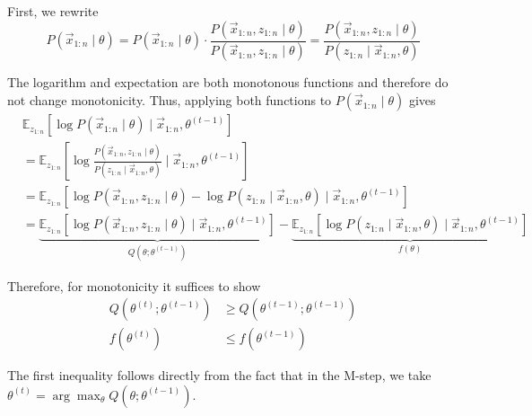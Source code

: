 First, we rewrite
\begin{equation*}
    P(\vec{x}_{1:n} \mid \theta)
    = P(\vec{x}_{1:n} \mid \theta) \cdot \frac{P(\vec{x}_{1:n}, z_{1:n} \mid \theta)}{P(\vec{x}_{1:n}, z_{1:n} \mid \theta)}
    = \frac{P(\vec{x}_{1:n}, z_{1:n} \mid \theta)}{P(z_{1:n} \mid \vec{x}_{1:n}, \theta)}
\end{equation*}

The logarithm and expectation are both
monotonous functions and therefore
do not change monotonicity.
Thus, applying both functions to
$P(\vec{x}_{1:n} \mid \theta)$ gives
\begin{align*}
    & \mathbb{E}_{z_{1:n}}\left[
        \log{P(\vec{x}_{1:n} \mid \theta)}
        \mid \vec{x}_{1:n}, \theta^{(t-1)}
    \right] \\
    &= \mathbb{E}_{z_{1:n}}\left[
        \log{\frac{P(\vec{x}_{1:n}, z_{1:n} \mid \theta)}{P(z_{1:n} \mid \vec{x}_{1:n}, \theta)}}
        \mid \vec{x}_{1:n}, \theta^{(t-1)}
    \right] \\
    &= \mathbb{E}_{z_{1:n}}\left[
        \log{P(\vec{x}_{1:n}, z_{1:n} \mid \theta)} - \log{P(z_{1:n} \mid \vec{x}_{1:n}, \theta)}
        \mid \vec{x}_{1:n}, \theta^{(t-1)}
    \right] \\
    &= \underbrace{
    \mathbb{E}_{z_{1:n}}\left[
        \log{P(\vec{x}_{1:n}, z_{1:n} \mid \theta)}
        \mid \vec{x}_{1:n}, \theta^{(t-1)}
    \right]
    }_{Q(\theta; \theta^{(t-1)})}
    -
    \underbrace{
    \mathbb{E}_{z_{1:n}}\left[
        \log{P(z_{1:n} \mid \vec{x}_{1:n}, \theta)}
        \mid \vec{x}_{1:n}, \theta^{(t-1)}
    \right]
    }_{f(\theta)}
\end{align*}

Therefore, for monotonicity
it suffices to show
\begin{align*}
    Q(\theta^{(t)}; \theta^{(t-1)}) &\geq Q(\theta^{(t - 1)}; \theta^{(t-1)}) \\
    f(\theta^{(t)}) &\leq f(\theta^{(t-1)})
\end{align*}

The first inequality follows directly from
the fact that in the M-step,
we take $\theta^{(t)} = \arg\max_\theta{Q(\theta; \theta^{(t-1)})}$.

